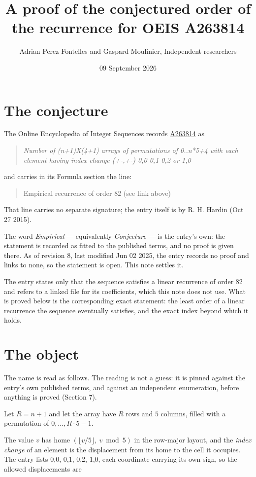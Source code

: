 \documentclass[11pt]{article}
\title{A proof of the conjectured order of the recurrence for OEIS A263814}
\author{Adrian Perez Fontelles and Gaspard Moulinier, Independent researchers}
\date{09 September 2026}
\theoremstyle{definition}
\begin{document}
\maketitle
\section{The conjecture}

The Online Encyclopedia of Integer Sequences records \href{https://oeis.org/A263814}{A263814} as

\begin{quote}\itshape Number of (n+1)X(4+1) arrays of permutations of 0..n*5+4 with each element having index change (+-,+-) 0,0 0,1 0,2 or 1,0\end{quote}

and carries in its Formula section the line:

\begin{quote}\ttfamily Empirical recurrence of order 82 (see link above)\end{quote}

That line carries no separate signature; the entry itself is by R. H. Hardin (Oct 27 2015).

The word {\itshape Empirical} --- equivalently {\itshape Conjecture} --- is the entry's own: the statement is recorded as fitted to the published terms, and no proof is given there. As of revision 8, last modified Jun 02 2025, the entry records no proof and links to none, so the statement is open. This note settles it.

The entry states only that the sequence satisfies a linear recurrence of order $82$ and refers to a linked file for its coefficients, which this note does not use. What is proved below is the corresponding exact statement: the least order of a linear recurrence the sequence eventually satisfies, and the exact index beyond which it holds.

\section{The object}

The name is read as follows. The reading is not a guess: it is pinned against the entry's own published terms, and against an independent enumeration, before anything is proved (Section 7).

Let $R = n + 1$ and let the array have $R$ rows and $5$ columns, filled with a permutation of $0,\dots,R\cdot5-1$.

The value $v$ has home $(\lfloor v/5\rfloor,\ v \bmod 5)$ in the row-major layout, and the {\itshape index change} of an element is the displacement from its home to the cell it occupies. The entry lists 0,0, 0,1, 0,2, 1,0, each coordinate carrying its own sign, so the allowed displacements are
\end{document}
